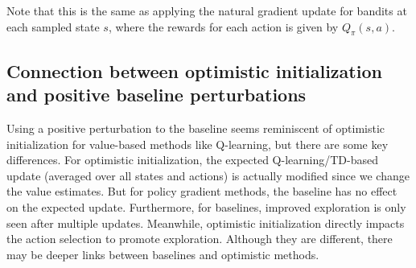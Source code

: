 Note that this is the same as applying the natural gradient update for bandits at each sampled state $s$, where the rewards for each action is given by $Q_\pi(s,a)$.

\subsection{Connection between optimistic initialization and positive baseline perturbations}
Using a positive perturbation to the baseline seems reminiscent of optimistic initialization for value-based methods like Q-learning, but there are some key differences.
For optimistic initialization, the expected Q-learning/TD-based update (averaged over all states and actions) is actually modified since we change the value estimates. But for policy gradient methods, the baseline has no effect on the expected update. Furthermore, for baselines, improved exploration is only seen after multiple updates. Meanwhile, optimistic initialization directly impacts the action selection to promote exploration. 
Although they are different, there may be deeper links between baselines and optimistic methods. 
